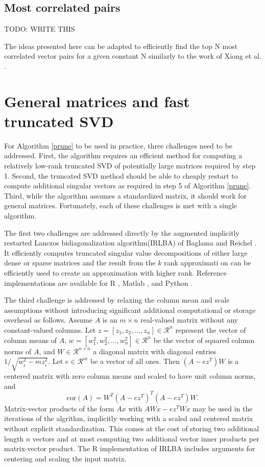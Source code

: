 \documentclass{article}
\let\proglang=\textsf
\numberwithin{algorithmctr}{section}
\begin{document}
\subsection{Most correlated pairs}

TODO: WRITE THIS

The ideas presented here can be adapted to efficiently find the top N most
correlated vector pairs for a given constant N similarly to the work of
Xiong et al. \cite{prune2}.

\section{General matrices and fast truncated SVD}\label{irlba}

For Algorithm \ref{prune} to be used in practice, three challenges need to be 
addressed. First, the algorithm requires an efficient method for computing a 
relatively low-rank truncated SVD of potentially large matrices required by step 
1. Second, the truncated SVD method should be able to cheaply restart to compute 
additional singular vectors as required in step 5 of Algorithm \ref{prune}. 
Third, while the algorithm assumes a standardized matrix, it should work for 
general matrices. Fortunately, each of these challenges is met with a single 
algorithm.

The first two challenges are addressed directly by the augmented implicitly 
restarted Lanczos bidiagonalization algorithm\break(IRLBA) of Baglama and Reichel 
\cite{irlba}. It efficiently computes truncated singular value decompositions of 
either large dense or sparse matrices and the result from the $k$ rank approximati
on can be efficiently used to create an approximation with higher rank. Reference 
implementations are available for \proglang{R} \cite{irlbar}, \proglang{Matlab} 
\cite{irlbam}, and \proglang{Python} \cite{irlbap}.

The third challenge is addressed by relaxing the column mean and scale 
assumptions without introducing significant additional computational or storage
overhead as follows. Assume $A$ is an $m\times n$ real-valued matrix without any 
constant-valued columns. Let $z=[z_1,z_2,\ldots,z_n]\in\mathcal{R}^n$ represent 
the vector of column means of $A$, $w=[w_1^2,w_2^2,\ldots,w_n^2]\in\mathcal{R}^n$
be the vector of squared column norms of $A$, and $W\in\mathcal{R}^{n\times n}$
a diagonal matrix with diagonal entries $1/\sqrt{w_i^2 - m z_i^2}$.  Let
$e\in\mathcal{R}^m$ be a vector of all ones.  Then $(A - ez^T)W$ is a centered
matrix with zero column means and scaled to have unit column norms, and
\[
\mathrm{cor}(A) = W^T (A-ez^T)^T (A-ez^T) W.
\]
Matrix-vector products of the form $Ax$ with $AWx - ez^TWx$ may be used in
the iterations of the algrithm, implicitly working with a scaled and 
centered matrix without explicit standardization. This comes at the cost 
of storing two additional length $n$ vectors and
at most computing two additional vector inner products per matrix-vector product.
The \proglang{R} implementation \cite{irlbar} of IRLBA includes arguments for centering and scaling the input matrix.
\end{document}
